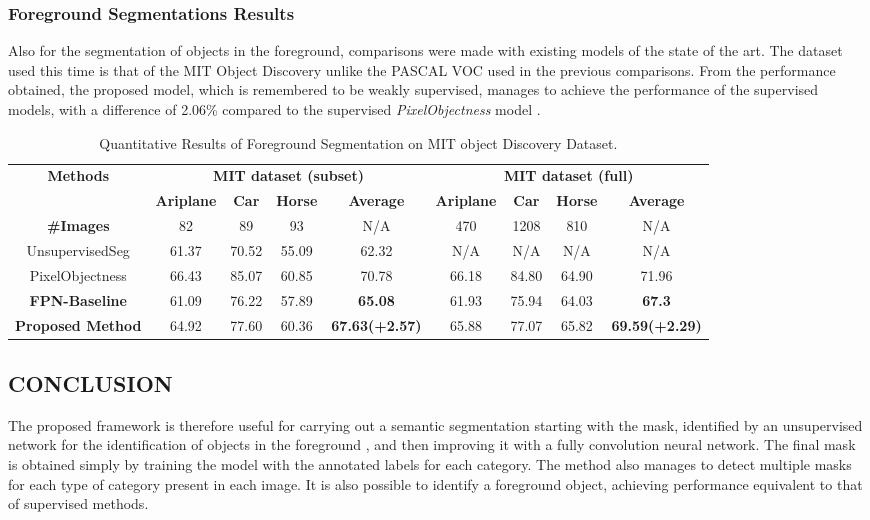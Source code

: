 \subsubsection{Foreground Segmentations Results}
Also for the segmentation of objects in the foreground, comparisons were 
made with existing models of the state of the art. The dataset used this 
time is that of the MIT Object Discovery unlike the PASCAL VOC used 
in the previous comparisons. From the performance obtained, the proposed 
model, which is remembered to be weakly supervised, manages to achieve the 
performance of the supervised models, with a difference of 2.06\% compared 
to the supervised \emph{PixelObjectness} model \cite{0876055538}.
\begin{table}[h!]
    \centering
    \begin{adjustbox}{max width=\textwidth}
    \begin{tabular}{|c||c|c|c|c||c|c|c|c|}
        \hline
        \multirow{2}{*}{\bfseries{Methods}} & \multicolumn{4}{c||}{\bfseries{MIT dataset (subset)}} & \multicolumn{4}{c|}{\bfseries{MIT dataset (full)}} \\            & \bfseries{Ariplane} & \bfseries{Car} & \bfseries{Horse}  & \bfseries{Average} & \bfseries{Ariplane} & \bfseries{Car} & \bfseries{Horse}  & \bfseries{Average} \\
        \hline
        \bfseries{\#Images} & 82 & 89 & 93 & N/A & 470 & 1208 & 810 & N/A\\
        \hline
        UnsupervisedSeg & 61.37 & 70.52 & 55.09 &62.32 & N/A & N/A & N/A & N/A\\
        \hline
        PixelObjectness & 66.43 & 85.07 & 60.85 &70.78 & 66.18 & 84.80 & 64.90 & 71.96\\
        \hline 
        \bfseries{FPN-Baseline} & 61.09 & 76.22 & 57.89 & \bfseries{65.08} & 61.93 & 75.94 & 64.03 & \bfseries{67.3}\\
        \hline
        \bfseries{Proposed Method} & 64.92 & 77.60 & 60.36 & \bfseries{67.63(+2.57)} & 65.88 & 77.07 & 65.82 & \bfseries{69.59(+2.29)}\\
        \hline
    \end{tabular}
    \end{adjustbox}
    \caption{Quantitative Results of Foreground Segmentation on MIT object Discovery Dataset.}
\end{table}

\subsection{CONCLUSION}
The proposed framework is therefore useful for carrying out a semantic segmentation 
starting with the mask, identified by an unsupervised network for 
the identification of objects in the foreground \cite{0876055520}, and then improving it 
with a fully convolution neural network. The final mask is obtained simply 
by training the model with the annotated labels for each category. The 
method also manages to detect multiple masks for each type of category 
present in each image. It is also possible to identify a foreground object, 
achieving performance equivalent to that of supervised methods.